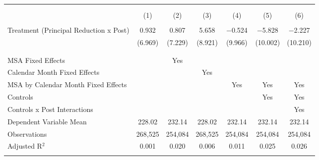 
\begin{tabular}{@{\extracolsep{5pt}}lcccccc} 
\\[-1.8ex]\hline 
\hline \\[-1.8ex] 
\\[-1.8ex] & (1) & (2) & (3) & (4) & (5) & (6)\\ 
\hline \\[-1.8ex] 
 Treatment (Principal Reduction x Post) & 0.932 & 0.807 & 5.658 & $-$0.524 & $-$5.828 & $-$2.227 \\ 
  & (6.969) & (7.229) & (8.921) & (9.966) & (10.002) & (10.210) \\ 
  & & & & & & \\ 
\hline \\[-1.8ex] 
MSA Fixed Effects &  & Yes &  &  &  &  \\ 
Calendar Month Fixed Effects &  &  & Yes &  &  &  \\ 
MSA by Calendar Month Fixed Effects &  &  &  & Yes & Yes & Yes \\ 
Controls &  &  &  &  & Yes & Yes \\ 
Controls x Post Interactions &  &  &  &  &  & Yes \\ 
Dependent Variable Mean & 228.02 & 232.14 & 228.02 & 232.14 & 232.14 & 232.14 \\ 
Observations & 268,525 & 254,084 & 268,525 & 254,084 & 254,084 & 254,084 \\ 
Adjusted R$^{2}$ & 0.001 & 0.020 & 0.006 & 0.011 & 0.025 & 0.026 \\ 
\hline 
\hline \\[-1.8ex] 
\end{tabular} 
